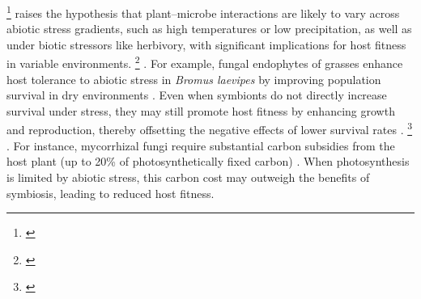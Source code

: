 \documentclass[12pt]{article}\usepackage[]{graphicx}\usepackage[dvipsnames]{xcolor}
\newcommand{\tom}[2]{{\color{red}{#1}}\footnote{\textit{\color{red}{#2}}}}
\begin{document}
\tom{Context-dependence}{What is the topic of this paragraph, and what is it intended to do differently than the preceding paragraphs? A lot of this material overlaps heavily with what you have already presented above. Think about the logic structure that you want for the intro, and make sure your paragraphs are taking readers through a logical progression of ideas.} raises the hypothesis that plant–microbe interactions are likely to vary across abiotic stress gradients, such as high temperatures or low precipitation, as well as under biotic stressors like herbivory, with significant implications for host fitness in variable environments. 
\tom{If microbial symbiosis provides greater benefits under these stressful conditions, symbionts could enhance host survival, growth, and reproduction.}{Statements like this are a little circular (``if symbionts are beneficial then the plant would benefit.'') Can you sharpen this?} \citep{allsup2023shifting,rudgers2020climate}. 
For example, fungal endophytes of grasses enhance host tolerance to abiotic stress in \emph{Bromus laevipes} by improving population survival in dry environments \citep{david2019soil,afkhami2014mutualist}.
Even when symbionts do not directly increase survival under stress, they may still promote host fitness by enhancing growth and reproduction, thereby offsetting the negative effects of lower survival rates \citep{yule2013costs}. 
\tom{Conversely, if microbial symbiosis becomes costly under stressful conditions, symbionts could reduce host fitness}{Also circular.} \citep{benning2021microbes,benning2021plant,bennett2022costs}. 
For instance, mycorrhizal fungi require substantial carbon subsidies from the host plant (up to 20\% of photosynthetically fixed carbon) \citep{thirkell2020carbon,soudzilovskaia2015quantitative}. 
When photosynthesis is limited by abiotic stress, this carbon cost may outweigh the benefits of symbiosis, leading to reduced host fitness.

\end{document}
